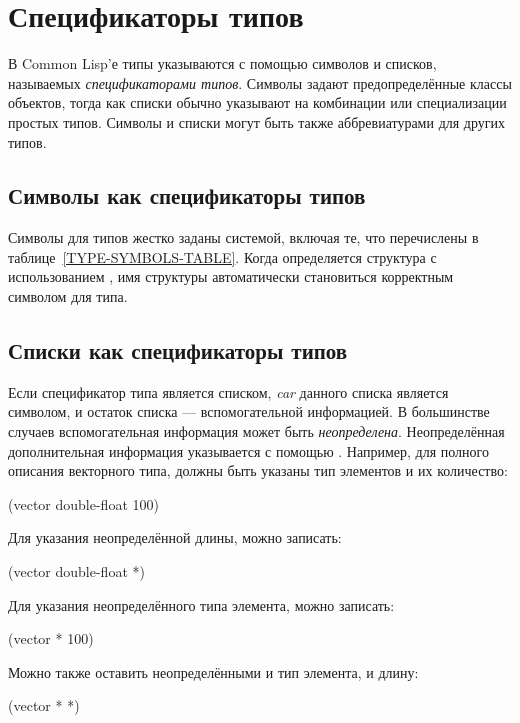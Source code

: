 \else %

\chapter{Спецификаторы типов}    %
\label{DTSPEC}

В Common Lisp'е типы указываются с помощью символов и списков, называемых
\emph{спецификаторами типов}. Символы задают 
предопределённые классы объектов, тогда как списки обычно указывают на
комбинации или специализации простых типов.
Символы и списки могут быть также аббревиатурами для других типов.

\section{Символы как спецификаторы типов}

Символы для типов жестко заданы системой, включая те, что перечислены в
таблице~\ref{TYPE-SYMBOLS-TABLE}.
Когда определяется структура с использованием , имя
структуры автоматически становиться корректным символом для типа.

\section{Списки как спецификаторы типов}

Если спецификатор типа является списком, \emph{car} данного списка является
символом, и остаток списка --- вспомогательной информацией. В большинстве случаев
вспомогательная информация может быть \emph{неопределена}. Неопределённая
дополнительная информация указывается с помощью \cd{*}. Например, для полного
описания векторного типа, должны быть указаны тип элементов и их количество:
\begin{lisp}
(vector double-float 100)
\end{lisp}

Для указания неопределённой длины, можно записать:
\begin{lisp}
(vector double-float *)
\end{lisp}

Для указания неопределённого типа элемента, можно записать:
\begin{lisp}
(vector * 100)
\end{lisp}

Можно также оставить неопределёнными и тип элемента, и длину:
\begin{lisp}
(vector * *)
\end{lisp}

